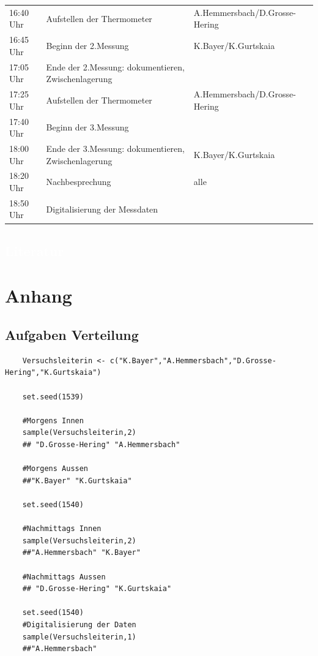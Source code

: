 \documentclass[ ngerman, fontsize= 12pt, paper=a4, headings=big, titlepage=true]{article}
\begin{document}
\begin{table}[h]
\begin{tabular}{l|l|l}
		16:40 Uhr	&	Aufstellen der Thermometer						&A.Hemmersbach/D.Grosse-Hering\\
		16:45 Uhr	&	Beginn der 2.Messung							&K.Bayer/K.Gurtskaia\\
		17:05 Uhr	& 	Ende der 2.Messung: dokumentieren, Zwischenlagerung &\\
		
		17:25 Uhr	&	Aufstellen der Thermometer						&A.Hemmersbach/D.Grosse-Hering\\
		17:40 Uhr	&	Beginn der 3.Messung							& \\
		18:00 Uhr	& 	Ende der 3.Messung: dokumentieren, Zwischenlagerung & K.Bayer/K.Gurtskaia\\
		
		\hline
		
		18:20 Uhr	&	Nachbesprechung									& alle \\
		18:50 Uhr	& 	Digitalisierung der Messdaten					&\\
		
		
	\end{tabular}
\end{table}
\newpage
\textcolor{white}{\section{Literatur}}
 

 
 \newpage

\renewcommand{\thesubsection}{\Alph{subsection}}


\section{Anhang}

\subsection{Aufgaben Verteilung} \label{Verteilung}
\begin{lstlisting}
	Versuchsleiterin <- c("K.Bayer","A.Hemmersbach","D.Grosse-Hering","K.Gurtskaia")
	
	set.seed(1539)
	
	#Morgens Innen
	sample(Versuchsleiterin,2)
	## "D.Grosse-Hering" "A.Hemmersbach" 
	
	#Morgens Aussen
	##"K.Bayer" "K.Gurtskaia"
	
	set.seed(1540)
	
	#Nachmittags Innen
	sample(Versuchsleiterin,2)
	##"A.Hemmersbach" "K.Bayer"
	
	#Nachmittags Aussen
	## "D.Grosse-Hering" "K.Gurtskaia"
	
	set.seed(1540)
	#Digitalisierung der Daten
	sample(Versuchsleiterin,1)
	##"A.Hemmersbach"
\end{lstlisting}
\end{document}
